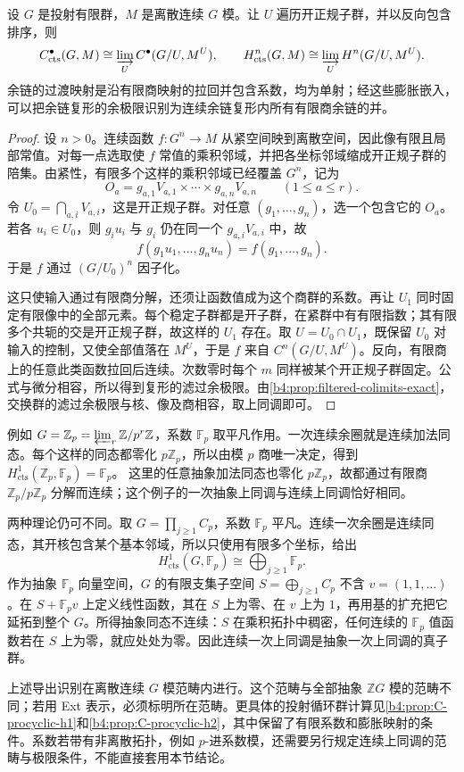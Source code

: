\begin{proposition}\label{b4:prop:continuous-finite-quotients}
	设 \(G\) 是投射有限群，\(M\) 是离散连续 \(G\) 模。让 \(U\) 遍历开正规子群，并以反向包含排序，则
	\[
		C_{\mathrm{cts}}^\bullet(G,M) \cong\varinjlim_U C^\bullet(G/U,M^U),\qquad H_{\mathrm{cts}}^n(G,M) \cong\varinjlim_U H^n(G/U,M^U).
	\]
	余链的过渡映射是沿有限商映射的拉回并包含系数，均为单射；经这些膨胀嵌入，可以把余链复形的余极限识别为连续余链复形内所有有限商余链的并。
\end{proposition}
\begin{proof}
	设 \(n>0\)。连续函数 \(f:G^n\to M\) 从紧空间映到离散空间，因此像有限且局部常值。对每一点选取使 \(f\) 常值的乘积邻域，并把各坐标邻域缩成开正规子群的陪集。由紧性，有限多个这样的乘积邻域已经覆盖 \(G^n\)，记为
	\[
		O_a=g_{a,1}V_{a,1}\times\cdots\times g_{a,n}V_{a,n} \qquad(1\le a\le r).
	\]
	令 \(U_0=\bigcap_{a,i}V_{a,i}\)，这是开正规子群。对任意 \((g_1,\ldots,g_n)\)，选一个包含它的 \(O_a\)。若各 \(u_i\in U_0\)，则 \(g_iu_i\) 与 \(g_i\) 仍在同一个 \(g_{a,i}V_{a,i}\) 中，故
	\[
		f(g_1u_1,\ldots,g_nu_n)=f(g_1,\ldots,g_n).
	\]
	于是 \(f\) 通过 \((G/U_0)^n\) 因子化。

	这只使输入通过有限商分解，还须让函数值成为这个商群的系数。再让 \(U_1\) 同时固定有限像中的全部元素。每个稳定子群都是开子群，在紧群中有有限指数；其有限多个共轭的交是开正规子群，故这样的 \(U_1\) 存在。取 \(U=U_0\cap U_1\)，既保留 \(U_0\) 对输入的控制，又使全部值落在 \(M^U\)，于是 \(f\) 来自 \(C^n(G/U,M^U)\)。反向，有限商上的任意此类函数拉回后连续。次数零时每个 \(m\) 同样被某个开正规子群固定。公式与微分相容，所以得到复形的滤过余极限。由\cref{b4:prop:filtered-colimits-exact}，交换群的滤过余极限与核、像及商相容，取上同调即可。
\end{proof}

例如 \(G=\mathbb Z_p=\varprojlim_r\mathbb Z/p^r\mathbb Z\)，系数 \(\mathbb F_p\) 取平凡作用。一次连续余圈就是连续加法同态。每个这样的同态都零化 \(p\mathbb Z_p\)，所以由模 \(p\) 商唯一决定，得到 \(H_{\mathrm{cts}}^1(\mathbb Z_p,\mathbb F_p)=\mathbb F_p\)。 这里的任意抽象加法同态也零化 \(p\mathbb Z_p\)，故都通过有限商 \(\mathbb Z_p/p\mathbb Z_p\) 分解而连续；这个例子的一次抽象上同调与连续上同调恰好相同。

\ProseParagraphBreak
两种理论仍可不同。取 \(G=\prod_{j\ge1}C_p\)，系数 \(\mathbb F_p\) 平凡。连续一次余圈是连续同态，其开核包含某个基本邻域，所以只使用有限多个坐标，给出
\[
	H^1_{\mathrm{cts}}(G,\mathbb F_p)\cong\bigoplus_{j\ge1}\mathbb F_p.
\]
作为抽象 \(\mathbb F_p\) 向量空间，\(G\) 的有限支集子空间 \(S=\bigoplus_{j\ge1}C_p\) 不含 \(v=(1,1,\ldots)\)。在 \(S+\mathbb F_pv\) 上定义线性函数，其在 \(S\) 上为零、在 \(v\) 上为 \(1\)，再用基的扩充把它延拓到整个 \(G\)。所得抽象同态不连续：\(S\) 在乘积拓扑中稠密，任何连续的 \(\mathbb F_p\) 值函数若在 \(S\) 上为零，就应处处为零。因此连续一次上同调是抽象一次上同调的真子群。

\ProseParagraphBreak
上述导出识别在离散连续 \(G\) 模范畴内进行。这个范畴与全部抽象 \(\mathbb ZG\) 模的范畴不同；若用 Ext 表示，必须标明所在范畴。更具体的投射循环群计算见\cref{b4:prop:C-procyclic-h1}和\cref{b4:prop:C-procyclic-h2}，其中保留了有限系数和膨胀映射的条件。系数若带有非离散拓扑，例如 \(p\)-进系数模，还需要另行规定连续上同调的范畴与极限条件，不能直接套用本节结论。
